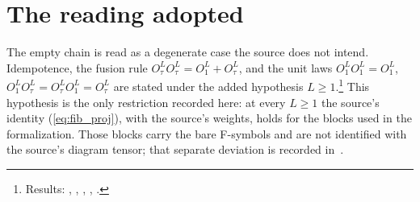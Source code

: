\documentclass{article}
\begin{document}
\section{The reading adopted}
The empty chain is read as a degenerate case the source does not intend.
Idempotence, the fusion rule $O_\tau^LO_\tau^L=O_1^L+O_\tau^L$, and the unit laws
$O_1^LO_1^L=O_1^L$, $O_1^LO_\tau^L=O_\tau^LO_1^L=O_\tau^L$ are stated under the
added hypothesis $L\geq1$.\footnote{Results:
    ,
    ,
    ,
    ,
    .}
This hypothesis is the only restriction recorded here: at every $L\geq1$ the
source's identity (\ref{eq:fib_proj}), with the source's weights, holds for the
blocks used in the formalization. Those blocks carry the bare F-symbols and are
not identified with the source's diagram tensor; that separate deviation is
recorded in~\cite{gap:bmwshv17_fibonacci_block_entries_provenance}.



\end{document}
